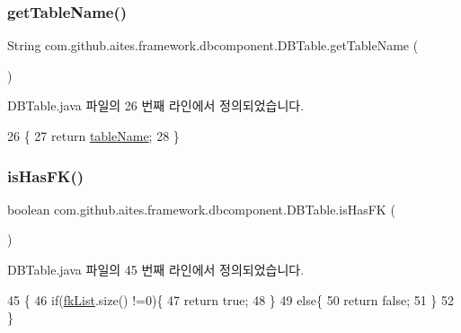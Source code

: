 \subsubsection{\texorpdfstring{get\+Table\+Name()}{getTableName()}}
{\footnotesize\ttfamily String com.\+github.\+aites.\+framework.\+dbcomponent.\+D\+B\+Table.\+get\+Table\+Name (\begin{DoxyParamCaption}{ }\end{DoxyParamCaption})}



D\+B\+Table.\+java 파일의 26 번째 라인에서 정의되었습니다.


\begin{DoxyCode}
26                                 \{
27         \textcolor{keywordflow}{return} \mbox{\hyperlink{classcom_1_1github_1_1aites_1_1framework_1_1dbcomponent_1_1_d_b_table_a13baee6ab61eeea3b604d2a7b99b11e7}{tableName}};
28     \}
\end{DoxyCode}
\mbox{\label{classcom_1_1github_1_1aites_1_1framework_1_1dbcomponent_1_1_d_b_table_a175465185eeb9e450a69df9ee90a71d0}} 
\subsubsection{\texorpdfstring{is\+Has\+F\+K()}{isHasFK()}}
{\footnotesize\ttfamily boolean com.\+github.\+aites.\+framework.\+dbcomponent.\+D\+B\+Table.\+is\+Has\+FK (\begin{DoxyParamCaption}{ }\end{DoxyParamCaption})}



D\+B\+Table.\+java 파일의 45 번째 라인에서 정의되었습니다.


\begin{DoxyCode}
45                             \{
46         \textcolor{keywordflow}{if}(\mbox{\hyperlink{classcom_1_1github_1_1aites_1_1framework_1_1dbcomponent_1_1_d_b_table_ae3a224a5b6fc20939a74e36127103bcc}{fkList}}.size() !=0)\{
47             \textcolor{keywordflow}{return} \textcolor{keyword}{true};
48         \}
49         \textcolor{keywordflow}{else}\{
50             \textcolor{keywordflow}{return} \textcolor{keyword}{false};
51         \}
52     \}
\end{DoxyCode}
\mbox{\label{classcom_1_1github_1_1aites_1_1framework_1_1dbcomponent_1_1_d_b_table_a9f9696d7da1da0802724003c7880c129}} 
